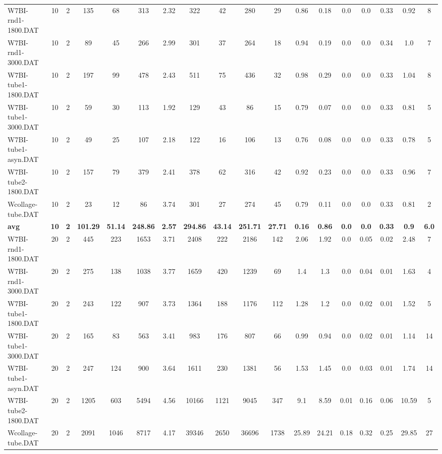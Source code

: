 \begin{sidewaystable}[h]
{\begin{tabular}{lccccccccccccccccc}
W7BI-rnd1-1800.DAT & 10 & 2 & 135 & 68 & 313 & 2.32 & 322 & 42 & 280 & 29 & 0.86 & 0.18 & 0.0 & 0.0 & 0.33 & 0.92 & 8\\
W7BI-rnd1-3000.DAT & 10 & 2 & 89 & 45 & 266 & 2.99 & 301 & 37 & 264 & 18 & 0.94 & 0.19 & 0.0 & 0.0 & 0.34 & 1.0 & 7\\
W7BI-tube1-1800.DAT & 10 & 2 & 197 & 99 & 478 & 2.43 & 511 & 75 & 436 & 32 & 0.98 & 0.29 & 0.0 & 0.0 & 0.33 & 1.04 & 8\\
W7BI-tube1-3000.DAT & 10 & 2 & 59 & 30 & 113 & 1.92 & 129 & 43 & 86 & 15 & 0.79 & 0.07 & 0.0 & 0.0 & 0.33 & 0.81 & 5\\
W7BI-tube1-asyn.DAT & 10 & 2 & 49 & 25 & 107 & 2.18 & 122 & 16 & 106 & 13 & 0.76 & 0.08 & 0.0 & 0.0 & 0.33 & 0.78 & 5\\
W7BI-tube2-1800.DAT & 10 & 2 & 157 & 79 & 379 & 2.41 & 378 & 62 & 316 & 42 & 0.92 & 0.23 & 0.0 & 0.0 & 0.33 & 0.96 & 7\\
Wcollage-tube.DAT & 10 & 2 & 23 & 12 & 86 & 3.74 & 301 & 27 & 274 & 45 & 0.79 & 0.11 & 0.0 & 0.0 & 0.33 & 0.81 & 2\\
\cline{1-18} \textbf{avg} & \textbf{10} & \textbf{2} & \textbf{101.29} & \textbf{51.14} & \textbf{248.86} & \textbf{2.57} & \textbf{294.86} & \textbf{43.14} & \textbf{251.71} & \textbf{27.71} & \textbf{0.16} & \textbf{0.86} & \textbf{0.0} & \textbf{0.0} & \textbf{0.33} & \textbf{0.9} & \textbf{6.0} \\ \cline{1-18}
W7BI-rnd1-1800.DAT & 20 & 2 & 445 & 223 & 1653 & 3.71 & 2408 & 222 & 2186 & 142 & 2.06 & 1.92 & 0.0 & 0.05 & 0.02 & 2.48 & 7\\
W7BI-rnd1-3000.DAT & 20 & 2 & 275 & 138 & 1038 & 3.77 & 1659 & 420 & 1239 & 69 & 1.4 & 1.3 & 0.0 & 0.04 & 0.01 & 1.63 & 4\\
W7BI-tube1-1800.DAT & 20 & 2 & 243 & 122 & 907 & 3.73 & 1364 & 188 & 1176 & 112 & 1.28 & 1.2 & 0.0 & 0.02 & 0.01 & 1.52 & 5\\
W7BI-tube1-3000.DAT & 20 & 2 & 165 & 83 & 563 & 3.41 & 983 & 176 & 807 & 66 & 0.99 & 0.94 & 0.0 & 0.02 & 0.01 & 1.14 & 14\\
W7BI-tube1-asyn.DAT & 20 & 2 & 247 & 124 & 900 & 3.64 & 1611 & 230 & 1381 & 56 & 1.53 & 1.45 & 0.0 & 0.03 & 0.01 & 1.74 & 14\\
W7BI-tube2-1800.DAT & 20 & 2 & 1205 & 603 & 5494 & 4.56 & 10166 & 1121 & 9045 & 347 & 9.1 & 8.59 & 0.01 & 0.16 & 0.06 & 10.59 & 5\\
Wcollage-tube.DAT & 20 & 2 & 2091 & 1046 & 8717 & 4.17 & 39346 & 2650 & 36696 & 1738 & 25.89 & 24.21 & 0.18 & 0.32 & 0.25 & 29.85 & 27\\

\end{tabular}}
\end{sidewaystable}

